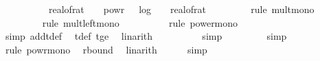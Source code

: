 \begin{isabellebody}
\ \ \ \ {}{}\ {\isacharasterisk}{\kern0pt}\ {}{}\ {\isacharasterisk}{\kern0pt}\ {\isacharparenleft}{\kern0pt}{}{}\ {\isacharslash}{\kern0pt}\ {\isacharparenleft}{\kern0pt}real{\isacharunderscore}{\kern0pt}of{\isacharunderscore}{\kern0pt}rat\ {\isasymdelta}{\isacharparenright}{\kern0pt}\ {\isacharasterisk}{\kern0pt}\ {}\ powr\ {\isacharparenleft}{\kern0pt}{\isacharminus}{\kern0pt}{}\ {\isacharasterisk}{\kern0pt}\ log\ {}\ {\isacharparenleft}{\kern0pt}{}\ {\isacharslash}{\kern0pt}\ real{\isacharunderscore}{\kern0pt}of{\isacharunderscore}{\kern0pt}rat\ {\isasymdelta}{\isacharparenright}{\kern0pt}\ {\isacharminus}{\kern0pt}\ {}{}{\isacharparenright}{\kern0pt}{\isachardoublequoteclose}\isanewline
\ \ \ \ \isamarkupfalse%
\ {\isacharparenleft}{\kern0pt}rule\ mult{\isacharunderscore}{\kern0pt}mono{\isacharparenright}{\kern0pt}\isanewline
\ \ \ \ \ \ \ \isamarkupfalse%
\ {\isacharparenleft}{\kern0pt}rule\ mult{\isacharunderscore}{\kern0pt}left{\isacharunderscore}{\kern0pt}mono{\isacharparenright}{\kern0pt}\isanewline
\ \ \ \ \ \ \ \ \isamarkupfalse%
\ {\isacharparenleft}{\kern0pt}rule\ power{\isacharunderscore}{\kern0pt}mono{\isacharparenright}{\kern0pt}\isanewline
\ \ \ \ \ \ \ \ \ \isamarkupfalse%
\ {\isacharparenleft}{\kern0pt}simp\ add{\isacharcolon}{\kern0pt}t{\isacharunderscore}{\kern0pt}def{\isacharparenright}{\kern0pt}\ \isamarkupfalse%
\ t{\isacharunderscore}{\kern0pt}def\ t{\isacharunderscore}{\kern0pt}ge{\isacharunderscore}{\kern0pt}{}\ \isamarkupfalse%
\ linarith\isanewline
\ \ \ \ \ \ \ \ \isamarkupfalse%
\ simp\isanewline
\ \ \ \ \ \ \ \isamarkupfalse%
\ simp\isanewline
\ \ \ \ \ \ \isamarkupfalse%
\ {\isacharparenleft}{\kern0pt}rule\ powr{\isacharunderscore}{\kern0pt}mono{\isacharparenright}{\kern0pt}\ \isamarkupfalse%
\ r{\isacharunderscore}{\kern0pt}bound\ \isamarkupfalse%
\ linarith\isanewline
\ \ \ \ \isamarkupfalse%
\ simp{\isacharplus}{\kern0pt}\isanewline
\ \ \isamarkupfalse%
\ \isamarkupfalse%

\end{isabellebody}
